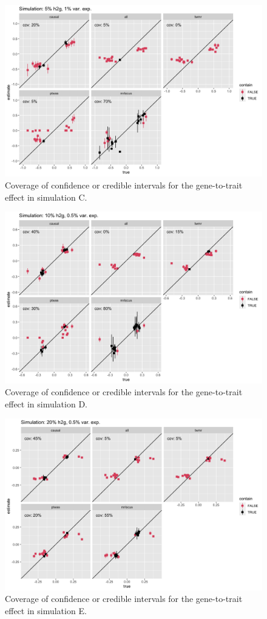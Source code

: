 \documentclass[11pt]{article}
\begin{document}
\begin{figure}[!ht]
  \centering
  \includegraphics[width=.8\textwidth]{figs/cover2.png}
  \caption{Coverage of confidence or credible intervals for the
    gene-to-trait effect in simulation C.}
\end{figure}

\begin{figure}[!ht]
  \centering
  \includegraphics[width=.8\textwidth]{figs/cover4.png}
  \caption{Coverage of confidence or credible intervals for the
    gene-to-trait effect in simulation D.}
\end{figure}

\begin{figure}[!ht]
  \centering
  \includegraphics[width=.8\textwidth]{figs/cover6.png}
  \caption{Coverage of confidence or credible intervals for the
    gene-to-trait effect in simulation E.}
\end{figure}
\end{document}
